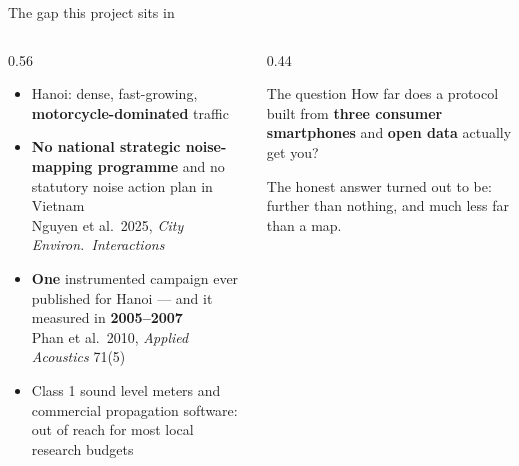 \documentclass[aspectratio=169,10pt]{beamer}
\newcommand{\aside}[1]{{\scriptsize\color{muted}#1}}
\begin{document}
\begin{frame}{The gap this project sits in}
  \begin{columns}[T]
    \begin{column}{0.56\textwidth}
      \begin{itemize}
        \item Hanoi: dense, fast-growing, \textbf{motorcycle-dominated} traffic
        \item \textbf{No national strategic noise-mapping programme} and no
              statutory noise action plan in Vietnam \\
              \aside{Nguyen et al.\ 2025, \emph{City Environ.\ Interactions}}
        \item \textbf{One} instrumented campaign ever published for Hanoi ---
              and it measured in \textbf{2005--2007} \\
              \aside{Phan et al.\ 2010, \emph{Applied Acoustics} 71(5)}
        \item Class 1 sound level meters and commercial propagation software:
              out of reach for most local research budgets
      \end{itemize}
    \end{column}
    \begin{column}{0.44\textwidth}
      \begin{alertblock}{The question}
        How far does a protocol built from \textbf{three consumer smartphones}
        and \textbf{open data} actually get you?
      \end{alertblock}
      \vspace{.5em}
      {\color{muted}The honest answer turned out to be: further than
      nothing, and much less far than a map.}
    \end{column}
  \end{columns}
\end{frame}
\end{document}
